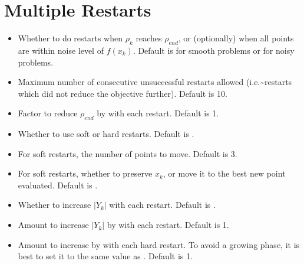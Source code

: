 \documentclass[letterpaper,10pt,english]{sphinxmanual}
\begin{document}
\section{Multiple Restarts}
\label{\detokenize{advanced:multiple-restarts}}\begin{itemize}
\item {} 
 \sphinxhyphen{} Whether to do restarts when \(\rho_k\) reaches \(\rho_{end}\), or (optionally) when all points are within noise level of \(f(x_k)\). Default is  for smooth problems or  for noisy problems.

\item {} 
 \sphinxhyphen{} Maximum number of consecutive unsuccessful restarts allowed (i.e.\textasciitilde{}restarts which did not reduce the objective further). Default is 10.

\item {} 
 \sphinxhyphen{} Factor to reduce \(\rho_{end}\) by with each restart. Default is 1.

\item {} 
 \sphinxhyphen{} Whether to use soft or hard restarts. Default is .

\item {} 
 \sphinxhyphen{} For soft restarts, the number of points to move. Default is 3.

\item {} 
 \sphinxhyphen{} For soft restarts, whether to preserve \(x_k\), or move it to the best new point evaluated. Default is .

\item {} 
 \sphinxhyphen{} Whether to increase \(|Y_k|\) with each restart. Default is .

\item {} 
 \sphinxhyphen{} Amount to increase \(|Y_k|\) by with each restart. Default is 1.

\item {} 
 \sphinxhyphen{} Amount to increase  by with each hard restart. To avoid a growing phase, it is best to set it to the same value as . Default is 1.


\end{itemize}
\end{document}

